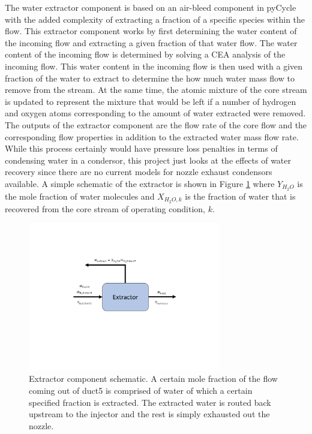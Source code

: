 \documentclass[conf]{new-aiaa}
\begin{document}
\noindent
The water extractor component is based on an air-bleed component in pyCycle with the added complexity of extracting a fraction of a specific species within the flow.
This extractor component works by first determining the water content of the incoming flow and extracting a given fraction of that water flow.
The water content of the incoming flow is determined by solving a CEA analysis of the incoming flow.
This water content in the incoming flow is then used with a given fraction of the water to extract to determine the how much water mass flow to remove from the stream.
At the same time, the atomic mixture of the core stream is updated to represent the mixture that would be left if a number of hydrogen and oxygen atoms corresponding to the amount of water extracted were removed.
The outputs of the extractor component are the flow rate of the core flow and the corresponding flow properties in addition to the extracted water mass flow rate.
While this process certainly would have pressure loss penalties in terms of condensing water in a condersor, this project just looks at the effects of water recovery since there are no current models for nozzle exhaust condensors available.
A simple schematic of the extractor is shown in Figure \ref{fig:extractor} where $Y_{H_2O}$ is the mole fraction of water molecules and $X_{H_2O,k}$ is the fraction of water that is recovered from the core stream of operating condition, $k$.

\begin{figure}[!hbt]
    \centering
    \includegraphics[width=0.75\textwidth]{extractor.pdf}
    \caption{
        Extractor component schematic.
        A certain mole fraction of the flow coming out of duct5 is comprised of water of which a certain specified fraction is extracted.
        The extracted water is routed back upstream to the injector and the rest is simply exhausted out the nozzle.
    }
    \label{fig:extractor}
\end{figure}
\end{document}
